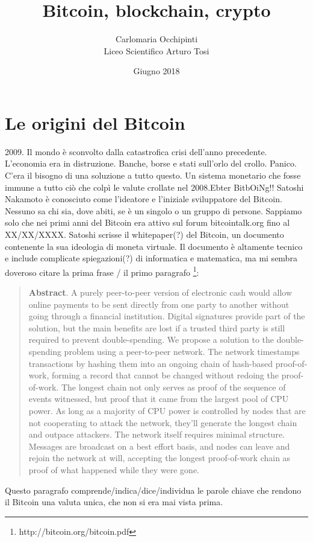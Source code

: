 \documentclass {article}
\title {{\Huge Bitcoin, blockchain, crypto}}
\author {Carlomaria Occhipinti\\Liceo Scientifico Arturo Tosi}
\date {Giugno 2018}
\begin{document}
\maketitle

\newpage

\tableofcontents


\newpage



\section {Le origini del Bitcoin}


2009. Il mondo è sconvolto dalla catastrofica crisi dell'anno precedente.
L'economia era in distruzione. Banche, borse e stati sull'orlo del crollo. Panico.
C'era il bisogno di una soluzione a tutto questo. Un sistema monetario che fosse immune a tutto ciò che colpì le valute crollate nel 2008.Ebter BitbOiNg!!
Satoshi Nakamoto è conosciuto come l'ideatore e l'iniziale sviluppatore del Bitcoin. Nessuno sa chi sia, dove abiti, se è un singolo o un gruppo di persone. Sappiamo solo che nei primi anni del Bitcoin era attivo sul forum bitcointalk.org fino al XX/XX/XXXX.
Satoshi scrisse il whitepaper(?) del Bitcoin, un documento contenente la sua ideologia di moneta virtuale. Il documento è altamente tecnico e include complicate spiegazioni(?) di informatica e matematica, ma mi sembra doveroso citare la prima frase / il primo paragrafo \footnote{http://bitcoin.org/bitcoin.pdf}:\\

\begin {quote}

\textbf {Abstract}. A purely peer-to-peer version of electronic cash would allow online payments to be sent directly from one party to another without going through a financial institution. Digital signatures provide part of the solution, but the main benefits are lost if a trusted third party is still required to prevent double-spending. We propose a solution to the double-spending problem using a peer-to-peer network. The network timestamps transactions by hashing them into an ongoing chain of hash-based proof-of-work, forming a record that cannot be changed without redoing the proof-of-work. The longest chain not only serves as proof of the sequence of events witnessed, but proof that it came from the largest pool of CPU power. As long as a majority of CPU power is controlled by nodes that are not cooperating to attack the network, they'll generate the longest chain and outpace attackers. The network itself requires minimal structure. Messages are broadcast on a best effort basis, and nodes can leave and rejoin the network at will, accepting the longest proof-of-work chain as proof of what happened while they were gone.

\end {quote}
Questo paragrafo comprende/indica/dice/individua le parole chiave che rendono il Bitcoin una valuta unica, che non si era mai vista prima.
\end{document}
